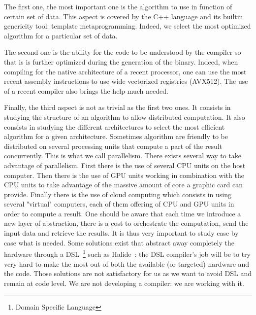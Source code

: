 The first one, the most important one is the algorithm to use in function of certain set of data. This aspect is covered
by the C++ language and its builtin genericity tool: template metaprogramming. Indeed, we select the most optimized
algorithm for a particular set of data.

The second one is the ability for the code to be understood by the compiler so that is is further optimized during the
generation of the binary. Indeed, when compiling for the native architecture of a recent processor, one can use the most
recent assembly instructions to use wide vectorized registries (AVX512). The use of a recent compiler also brings the
help much needed.

Finally, the third aspect is not as trivial as the first two ones. It consists in studying the structure of an algorithm
to allow distributed computation. It also consists in studying the different architectures to select the most efficient
algorithm for a given architecture. Sometimes algorithm are friendly to be distributed on several processing units that
compute a part of the result concurrently. This is what we call parallelism. There exists several way to take advantage
of parallelism. First there is the use of several CPU units on the host computer. Then there is the use of GPU units
working in combination with the CPU units to take advantage of the massive amount of core a graphic card can provide.
Finally there is the use of cloud computing which consists in using several "virtual" computers, each of them offering
of CPU and GPU units in order to compute a result. One should be aware that each time we introduce a new layer of
abstraction, there is a cost to orchestrate the computation, send the input data and retrieve the results. It is thus
very important to study case by case what is needed. Some solutions exist that abstract away completely the hardware
through a DSL~\footnote{Domain Specific Language} such as Halide~\cite{ragankelley.2013.halide}: the DSL compiler's job
will be to try very hard to make the most out of both the available (or targeted) hardware and the code. Those solutions
are not satisfactory for us as we want to avoid DSL and remain at code level. We are not developing a compiler: we are
working with it.

